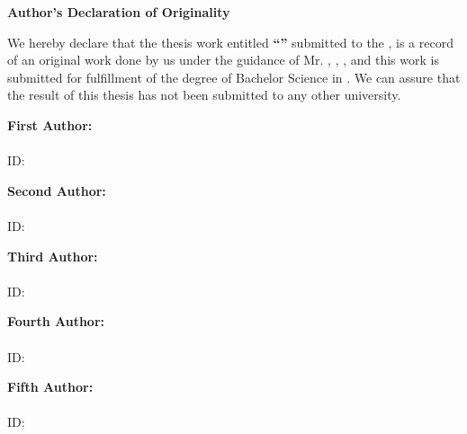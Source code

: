 \setlength{\tabcolsep}{18pt} %

\renewcommand{\arraystretch}{1.5}

\begin{center}
    \LARGE{\textbf{Author's Declaration of Originality}}
\end{center}

We hereby declare that the thesis work entitled \textbf{“\projectTitle”} submitted to the \university, is a record of an original work done by us under the guidance of Mr. \supervisorName, \supervisorDesignation, \department, \university{} and this work is submitted for fulfillment of the degree of Bachelor Science in \dept. We can assure that the result of this thesis has not been submitted to any other university.

\vspace{0.8cm}

\noindent \textbf{First Author:} \\
 {\firstAuthorName} \\
ID: \firstAuthorId

\vspace{0.3cm}

\noindent \textbf{Second Author:} \\
 {\secondAuthorName} \\
ID: \secondAuthorId

\vspace{0.3cm}

\noindent \textbf{Third Author:} \\
 {\thirdAuthorName} \\
ID: \thirdAuthorId

\vspace{0.3cm}

\noindent \textbf{Fourth Author:} \\
 {\fourthAuthorName} \\
ID: \fourthAuthorId

\vspace{0.3cm}

\noindent \textbf{Fifth Author:} \\
 {\fifthAuthorName} \\
ID: \fifthAuthorId

\vspace{0.8cm}


